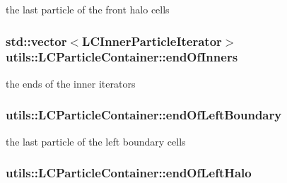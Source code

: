 the last particle of the front halo cells \hypertarget{classutils_1_1LCParticleContainer_ade99764026a9b58da86c8513d8f22121}{
\subsubsection[{end\-Of\-Inners}]{\setlength{\rightskip}{0pt plus 5cm}std\-::vector$<${\bf L\-C\-Inner\-Particle\-Iterator}$>$ utils\-::\-L\-C\-Particle\-Container\-::end\-Of\-Inners\hspace{0.3cm}{\ttfamily [private]}}}\label{classutils_1_1LCParticleContainer_ade99764026a9b58da86c8513d8f22121}
the ends of the inner iterators \hypertarget{classutils_1_1LCParticleContainer_a3d2942e316e92997c4b4eac72dcf4605}{
\subsubsection[{end\-Of\-Left\-Boundary}]{ utils\-::\-L\-C\-Particle\-Container\-::end\-Of\-Left\-Boundary\hspace{0.3cm}{\ttfamily [private]}}}\label{classutils_1_1LCParticleContainer_a3d2942e316e92997c4b4eac72dcf4605}
the last particle of the left boundary cells \hypertarget{classutils_1_1LCParticleContainer_a86ea17dc08f3a1ff1a20b85c8b39f800}{
\subsubsection[{end\-Of\-Left\-Halo}]{ utils\-::\-L\-C\-Particle\-Container\-::end\-Of\-Left\-Halo\hspace{0.3cm}{\ttfamily [private]}}}\label{classutils_1_1LCParticleContainer_a86ea17dc08f3a1ff1a20b85c8b39f800}
